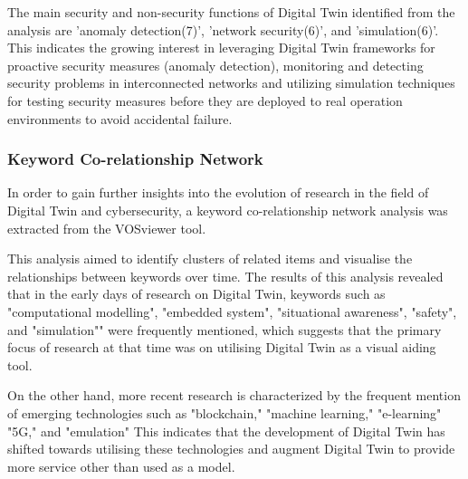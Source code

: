 The main security and non-security functions of Digital Twin identified from the analysis are 'anomaly detection(7)', 'network security(6)', and 'simulation(6)'. This indicates the growing interest in leveraging Digital Twin frameworks for proactive security measures (anomaly detection), monitoring and detecting security problems in interconnected networks and utilizing simulation techniques for testing security measures before they are deployed to real operation environments to avoid accidental failure. 

\subsubsection*{Keyword Co-relationship Network}
In order to gain further insights into the evolution of research in the field of Digital Twin and cybersecurity, a keyword co-relationship network analysis was extracted from the VOSviewer tool. 

This analysis aimed to identify clusters of related items and visualise the relationships between keywords over time. The results of this analysis revealed that in the early days of research on Digital Twin, keywords such as "computational modelling", "embedded system", "situational awareness", "safety", and "simulation"" were frequently mentioned, which suggests that the primary focus of research at that time was on utilising Digital Twin as a visual aiding tool. 

On the other hand, more recent research is characterized by the frequent mention of emerging technologies such as "blockchain," "machine learning," "e-learning" "5G," and "emulation" This indicates that the development of Digital Twin has shifted towards utilising these technologies and augment Digital Twin to provide more service other than used as a model.



